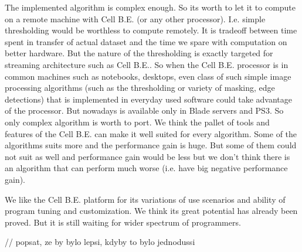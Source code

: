\par
The implemented algorithm is complex enough.
So its worth to let it to compute on a remote machine with Cell B.E. (or any other processor).
I.e. simple thresholding would be worthless to compute remotely.
It is tradeoff between time spent in transfer of actual dataset and the time we spare with computation on better hardware.
But the nature of the thresholding is exactly targeted for streaming architecture such as Cell B.E..
So when the Cell B.E. processor is in common machines such as notebooks, desktops, even class of such simple image processing algorithms (such as the thresholding or variety of masking, edge detections) that is implemented in everyday used software could take advantage of the processor.
But nowadays is available only in Blade servers and PS3.
So only complex algorithm is worth to port.
We think the pallet of tools and features of the Cell B.E. can make it well suited for every algorithm.
Some of the algorithms suits more and the performance gain is huge.
But some of them could not suit as well and performance gain would be less but we don't think there is an algorithm that can perform much worse (i.e. have big negative performance gain).

We like the Cell B.E. platform for its variations of use scenarios and ability of program tuning and customization.
We think its great potential has already been proved.
But it is still waiting for wider spectrum of programmers.

// popsat, ze by bylo lepsi, kdyby to bylo jednodussi